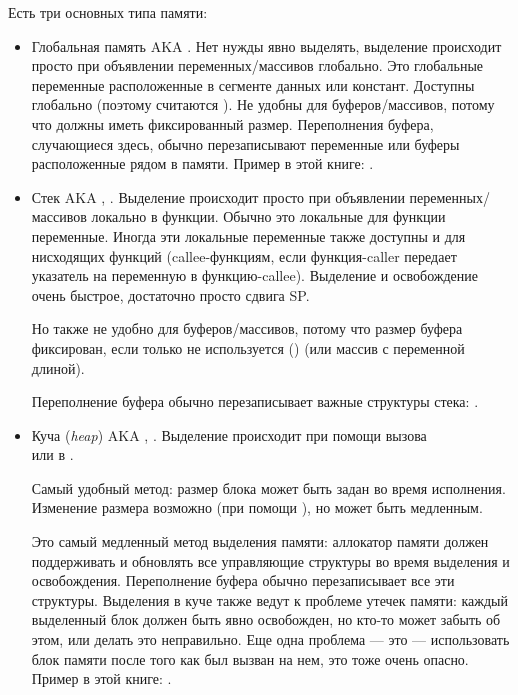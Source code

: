 ﻿

Есть три основных типа памяти:

\begin{itemize}
\item
Глобальная память \ac{AKA} .
Нет нужды явно выделять, выделение происходит просто при объявлении переменных/массивов 
глобально.
Это глобальные переменные расположенные в сегменте данных или констант.
Доступны глобально (поэтому считаются ).
Не удобны для буферов/массивов, потому что должны иметь фиксированный размер.
Переполнения буфера, случающиеся здесь, обычно перезаписывают переменные или буферы
расположенные рядом в памяти.
Пример в этой книге: .

\item
Стек \ac{AKA} , .
Выделение происходит просто при объявлении переменных/массивов локально в функции.%
Обычно это локальные для функции переменные.
Иногда эти локальные переменные также доступны и для нисходящих функций (\gls{callee}-функциям, если функция-\gls{caller} передает
указатель на переменную в функцию-\gls{callee}).
Выделение и освобождение очень быстрое, достаточно просто сдвига \ac{SP}.

Но также не удобно для буферов/массивов, потому что размер буфера фиксирован,
если только не используется  () (или массив с переменной длиной).

Переполнение буфера обычно перезаписывает важные структуры стека: .

\item
Куча (\emph{heap}) \ac{AKA} , .
Выделение происходит при помощи вызова \\
 или  в \Cpp.

Самый удобный метод: размер блока может быть задан во время исполнения.
Изменение размера возможно (при помощи ), но может быть медленным.

Это самый медленный метод выделения памяти: аллокатор памяти должен поддерживать и обновлять
все управляющие структуры во время выделения и освобождения.
Переполнение буфера обычно перезаписывает все эти структуры.
Выделения в куче также ведут к проблеме утечек памяти: каждый выделенный блок должен быть
явно освобожден, но кто-то может забыть об этом, или делать это неправильно.
Еще одна проблема --- это  --- использовать блок памяти после
того как  был вызван на нем, это тоже очень опасно.
Пример в этой книге:
.

\end{itemize}
